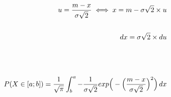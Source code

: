 \documentclass[preview]{standalone}
\begin{document}
\begin{align*}
u = {{m-x} \over {\sigma \sqrt{2}} }\iff x = m - \sigma \sqrt{2} \times u\\ \\dx = \sigma \sqrt{2} \times du\\ \\ \\ \\ P( X \in [a;b] ) = { \frac{1}{\sqrt{\pi}} } \int_b^a { { - \frac{1}{\sigma \sqrt{2}} } exp\Big(-{ \Big( \frac{m - x}{\sigma \sqrt{2}} \Big)^2 }\Big) } \, dx
\end{align*}
\end{document}

